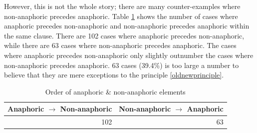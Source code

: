 
However,
this is not the whole story;
there are many counter-examples where non-anaphoric precedes anaphoric.%
Table \ref{GNT} shows the number of cases
where anaphoric precedes non-anaphoric and non-anaphoric precedes anaphoric within the same clause.
There are 102 cases where anaphoric precedes non-anaphoric,
while there are 63 cases where non-anaphoric precedes anaphoric.
The cases where anaphoric precedes non-anaphoric only slightly outnumber the cases where non-anaphoric precedes anaphoric.
63 cases (39.4\%) is too large a number to believe that
they are mere exceptions to the principle \ref{oldnewprinciple}.

\begin{table}
\centering
	\caption{Order of anaphoric \& non-anaphoric elements}
\begin{tabular}{rr}
	\toprule
	Anaphoric $\to$ Non-anaphoric & Non-anaphoric $\to$ Anaphoric \\
	\hline
	102 & 63 \\
	\bottomrule
\end{tabular}
	\label{GNT}
\end{table}

